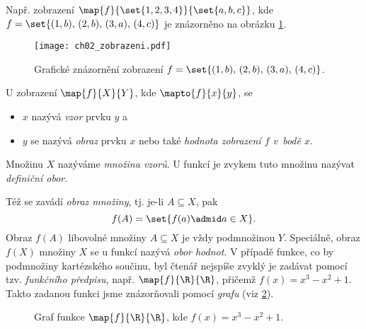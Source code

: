 Např. zobrazení $\map{f}{\set{1,2,3,4}}{\set{a,b,c}}$, kde $f=\set{(1,b),\,(2,b),\,(3,a),\,(4,c)}$ je znázorněno na obrázku \ref{fig:zobrazeni}.
\begin{figure}[H]
    \centering
    \texttt{[image: ch02\_zobrazeni.pdf]}
    \caption{Grafické znázornění zobrazení $f=\set{(1,b),\,(2,b),\,(3,a),\,(4,c)}$.}
    \label{fig:zobrazeni}
\end{figure}
U zobrazení $\map{f}{X}{Y}$, kde $\mapto{f}{x}{y}$, se
\begin{itemize}
    \item $x$ nazývá \emph{vzor} prvku $y$ a
    \item $y$ se nazývá \emph{obraz} prvku $x$ nebo také \emph{hodnota zobrazení $f$ v~bodě $x$}.
\end{itemize}
Množinu $X$ nazýváme \emph{množina vzorů}. U funkcí je zvykem tuto množinu nazývat \emph{definiční obor}.\par
Též se zavádí \emph{obraz množiny}, tj. je-li $A\subseteq X$, pak
\begin{equation*}
    f(A)=\set{f(a) \admid a\in X}.
\end{equation*}
Obraz $f(A)$ libovolné množiny $A\subseteq X$ je vždy podmnožinou $Y$. Speciálně, obraz $f(X)$ množiny $X$ se u funkcí nazývá \emph{obor hodnot}.  
V případě funkce, co by podmnožiny kartézského součinu, byl čtenář nejspíše zvyklý je zadávat pomocí tzv. \emph{funkčního předpisu}, např. $\map{f}{\R}{\R}$, přičemž $f(x)=x^3-x^2+1$. Takto zadanou funkci jsme znázorňovali pomocí \emph{grafu} (viz \ref{fig:funkce_graf}).
\begin{figure}[H]
    \centering
    
    \caption{Graf funkce $\map{f}{\R}{\R}$, kde $f(x)=x^3-x^2+1$.}
    \label{fig:funkce_graf}
\end{figure}

